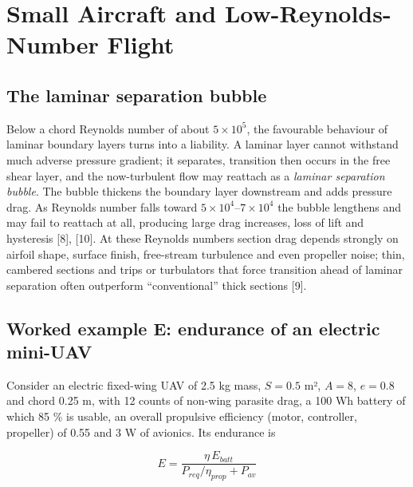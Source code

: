 \documentclass[10pt,a4paper,twocolumn]{article}
\begin{document}
\hypertarget{small-aircraft-and-low-reynolds-number-flight}{%
\section{Small Aircraft and Low-Reynolds-Number
Flight}\label{small-aircraft-and-low-reynolds-number-flight}}

\hypertarget{the-laminar-separation-bubble}{%
\subsection{The laminar separation
bubble}\label{the-laminar-separation-bubble}}

Below a chord Reynolds number of about \(5\times10^5\), the favourable
behaviour of laminar boundary layers turns into a liability. A laminar
layer cannot withstand much adverse pressure gradient; it separates,
transition then occurs in the free shear layer, and the now-turbulent
flow may reattach as a \emph{laminar separation bubble}. The bubble
thickens the boundary layer downstream and adds pressure drag. As
Reynolds number falls toward \(5\times10^4\)--\(7\times10^4\) the bubble
lengthens and may fail to reattach at all, producing large drag
increases, loss of lift and hysteresis {[}8{]}, {[}10{]}. At these
Reynolds numbers section drag depends strongly on airfoil shape, surface
finish, free-stream turbulence and even propeller noise; thin, cambered
sections and trips or turbulators that force transition ahead of laminar
separation often outperform ``conventional'' thick sections {[}9{]}.

\hypertarget{worked-example-e-endurance-of-an-electric-mini-uav}{%
\subsection{Worked example E: endurance of an electric
mini-UAV}\label{worked-example-e-endurance-of-an-electric-mini-uav}}

Consider an electric fixed-wing UAV of 2.5 kg mass, \(S=0.5\) m²,
\(A=8\), \(e=0.8\) and chord 0.25 m, with 12 counts of non-wing parasite
drag, a 100 Wh battery of which 85 \% is usable, an overall propulsive
efficiency (motor, controller, propeller) of 0.55 and 3 W of avionics.
Its endurance is

\[E = \frac{\eta\,E_{batt}}{P_{req}/\eta_{prop} + P_{av}} \tag{14}\]
\end{document}
